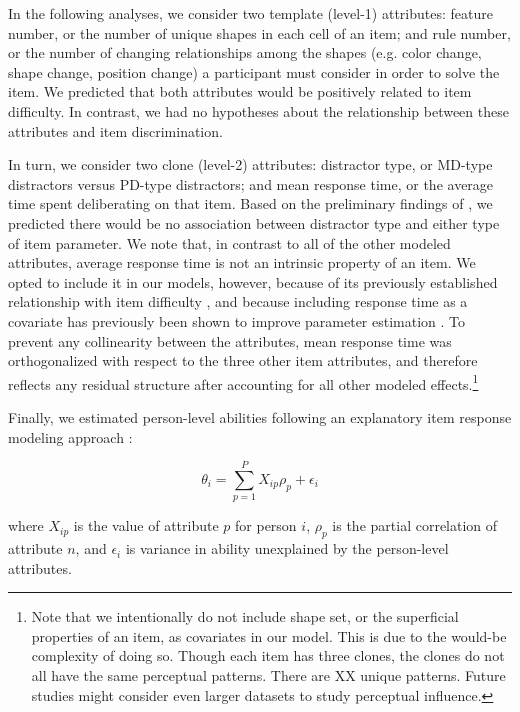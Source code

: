 \documentclass[a4paper,man,natbib]{apa6}
\begin{document}
In the following analyses, we consider two template (level-1) attributes: feature number, or the number of unique shapes in each cell of an item; and rule number, or the number of changing relationships among the shapes (e.g. color change, shape change, position change) a participant must consider in order to solve the item. We predicted that both attributes would be positively related to item difficulty. In contrast, we had no hypotheses about the relationship between these attributes and item discrimination.

In turn, we consider two clone (level-2) attributes: distractor type, or MD-type distractors versus PD-type distractors; and mean response time, or the average time spent deliberating on that item. Based on the preliminary findings of \cite{chierchia2019matrix}, we predicted there would be no association between distractor type and either type of item parameter. We note that, in contrast to all of the other modeled attributes, average response time is not an intrinsic property of an item. We opted to include it in our models, however, because of its previously established relationship with item difficulty \citep{chierchia2019matrix}, and because including response time as a covariate has previously been shown to improve parameter estimation \citep{bertling2018using}. To prevent any collinearity between the attributes, mean response time was orthogonalized with respect to the three other item attributes, and therefore reflects any residual structure after accounting for all other modeled effects.\footnote{Note that we intentionally do not include shape set, or the superficial properties of an item, as covariates in our model. This is due to the would-be complexity of doing so. Though each item has three clones, the clones do not all have the same perceptual patterns. There are XX unique patterns. Future studies might consider even larger datasets to study perceptual influence.}

Finally, we estimated person-level abilities following an explanatory item response modeling approach \citep{wilson2008explanatory}:   

\begin{equation} \label{eq:4}
\theta_i = \sum_{p=1}^P X_{ip} \rho_p + \epsilon_i    
\end{equation}

\noindent where $X_{ip}$ is the value of attribute $p$ for person $i$, $\rho_p$ is the partial correlation of attribute $n$, and $\epsilon_i$ is variance in ability unexplained by the person-level attributes.
\end{document}
